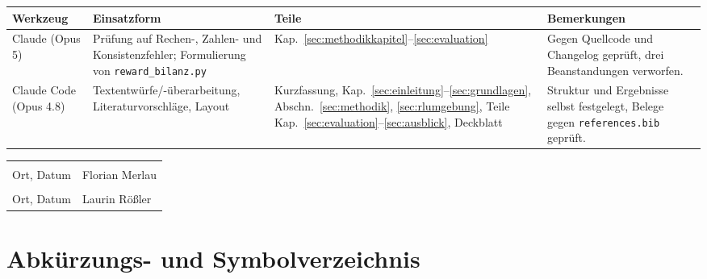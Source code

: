 \documentclass[11pt,a4paper]{article}
\let\sfOldSection\section
\renewcommand{\section}{\clearpage\sfOldSection}
\begin{document}
\noindent
\footnotesize
\begin{tabular}{@{}L{2.6cm}L{5.0cm}L{1.9cm}L{4.4cm}@{}}
\toprule
\textbf{Werkzeug} & \textbf{Einsatzform} & \textbf{Teile} & \textbf{Bemerkungen} \\
\midrule
Claude (Opus 5)
  & Prüfung auf Rechen-, Zahlen- und Konsistenzfehler; Formulierung von
    \texttt{reward\_bilanz.py}
  & Kap.~\ref{sec:methodikkapitel}--\ref{sec:evaluation}
  & Gegen Quellcode und Changelog geprüft, drei Beanstandungen verworfen. \\
\addlinespace
Claude Code (Opus 4.8)
  & Textentwürfe/-überarbeitung, Literaturvorschläge, Layout
  & Kurzfassung, Kap.~\ref{sec:einleitung}--\ref{sec:grundlagen},
    Abschn.~\ref{sec:methodik}, \ref{sec:rlumgebung}, Teile
    Kap.~\ref{sec:evaluation}--\ref{sec:ausblick}, Deckblatt
  & Struktur und Ergebnisse selbst festgelegt, Belege gegen
    \texttt{references.bib} geprüft. \\
\bottomrule
\end{tabular}
\normalsize

\vspace{0.5cm}

\noindent
\begin{tabular}{@{}p{6cm}p{6cm}@{}}
\hrulefill & \hrulefill \\[0.2cm]
Ort, Datum & Florian Merlau \\[1.5cm]
\hrulefill & \hrulefill \\[0.2cm]
Ort, Datum & Laurin Rößler \\
\end{tabular}

\clearpage

\tableofcontents
\clearpage

\listoffigures
{}
\clearpage

\listoftables
{}
\clearpage

\section*{Abkürzungs- und Symbolverzeichnis}
\end{document}
